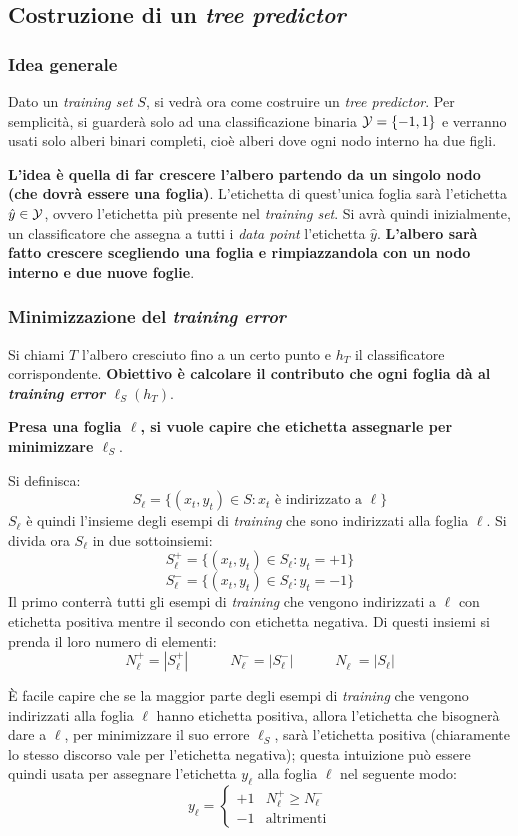 \subsection{Costruzione di un \textit{tree predictor}}
\subsubsection{Idea generale}
Dato un \textit{training set} $S$, si vedrà ora come costruire un \textit{tree predictor}.
Per semplicità, si guarderà solo ad una classificazione binaria $\mathcal{Y}=\{-1,1\}$ e verranno
usati solo alberi binari completi, cioè alberi dove ogni nodo interno ha due figli.

\textbf{L'idea è quella di far crescere l'albero partendo da un singolo nodo (che dovrà 
essere una foglia)}. L'etichetta di quest'unica foglia sarà l'etichetta $\hat{y} \in \mathcal{Y}$,
ovvero l'etichetta più presente nel \textit{training set}. Si avrà quindi inizialmente, 
un classificatore che assegna a tutti i \textit{data point} l'etichetta $\hat{y}$.
\textbf{L'albero sarà fatto crescere scegliendo una foglia e rimpiazzandola con un nodo
interno e due nuove foglie}.

\subsubsection{Minimizzazione del \textit{training error}}
Si chiami $T$ l'albero cresciuto fino a un certo punto e $h_T$ il classificatore
corrispondente. \textbf{Obiettivo è calcolare il contributo che ogni foglia dà al
\textit{training error} $\ell_S(h_T)$}.

\textbf{Presa una foglia $\ell$, si vuole capire che etichetta assegnarle per
minimizzare $\ell_S$}.

Si definisca:
$$ S_{\ell} = \{(x_t,y_t) \in S : \text{$x_t$ è indirizzato a $\ell$}\} $$
$S_{\ell}$ è quindi l'insieme degli esempi di \textit{training} che sono indirizzati
alla foglia $\ell$. Si divida ora $S_{\ell}$ in due sottoinsiemi:
$$ S_{\ell}^+ = \{(x_t,y_t) \in S_{\ell} : y_t=+1\} $$
$$ S_{\ell}^- = \{(x_t,y_t) \in S_{\ell} : y_t=-1\} $$
Il primo conterrà tutti gli esempi di \textit{training} che vengono indirizzati a $\ell$
con etichetta positiva mentre il secondo con etichetta negativa. Di questi insiemi
si prenda il loro numero di elementi:
$$ N_{\ell}^+ = |S_{\ell}^+| \qquad\quad N_{\ell}^- = |S_{\ell}^-| \qquad\quad
N_{\ell}^{\phantom{+}} = |S_{\ell}| $$

È facile capire che se la maggior parte degli esempi di \textit{training} che vengono
indirizzati alla foglia $\ell$ hanno etichetta positiva, allora l'etichetta che bisognerà 
dare a $\ell$, per minimizzare il suo errore $\ell_S$, sarà l'etichetta positiva 
(chiaramente lo stesso discorso vale per l'etichetta negativa); questa intuizione può
essere quindi usata per assegnare l'etichetta $y_{\ell}$ alla foglia $\ell$ nel seguente
modo:
$$ y_{\ell} = 
\begin{cases}
+1 &  N_{\ell}^+ \geq N_{\ell}^- \\
-1 & \text{altrimenti}
\end{cases}
$$

